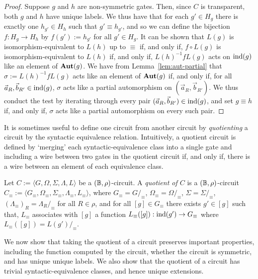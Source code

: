 \documentclass[../paper.tex]{subfiles}
\begin{document}
\begin{proof}
  Suppose $g$ and $h$ are non-symmetric gates. Then, since $C$ is transparent,
  both $g$ and $h$ have unique labels. We thus have that for each $g' \in H_g$
  there is exactly one $h_{g'} \in H_h$ such that $g' \equiv h_{g'}$, and so we
  can define the bijection $f : H_g \rightarrow H_h$ by $f(g') := h_{g'}$ for
  all $g' \in H_g$. It can be shown that $L(g)$ is isomorphism-equivalent to
  $L(h)$ up to $\equiv$ if, and only if, $f \circ L(g)$ is
  isomorphism-equivalent to $L(h)$ if, and only if, $L(h)^{-1} f L(g)$ acts on
  $\text{\upshape ind} (g)$ like an element of $\text{\textbf{Aut}}(g)$. We have from
  Lemma~\ref{lem:aut-partial} that $\sigma := L(h)^{-1} f L(g)$ acts like an
  element of $\text{\textbf{Aut}}(g)$ if, and only if, for all $\vec{a}_R, \vec{b}_{R'} \in
  \text{\upshape ind}(g)$, $\sigma$ acts like a partial automorphism on $(\vec{a}_R,
  \vec{b}_{R'})$. We thus conduct the test by iterating through every pair
  $(\vec{a}_R, \vec{b}_{R'}) \in \text{\upshape ind}(g)$, and set $g \equiv h$ if, and only if,
  $\sigma$ acts like a partial automorphism on every such pair.
\end{proof}

It is sometimes useful to define one circuit from another circuit by
\emph{quotienting} a circuit by the syntactic equivalence relation. Intuitively,
a quotient circuit is defined by `merging' each syntactic-equivalence class into
a single gate and including a wire between two gates in the quotient circuit if,
and only if, there is a wire between an element of each equivalence class.

\begin{definition}
  Let $C := \langle G, \Omega, \Sigma, \Lambda, L \rangle$ be a $(\mathbb{B},
  \rho)$-circuit. A \emph{quotient of $C$} is a $(\mathbb{B}, \rho)$-circuit $C_\equiv
  := \langle G_\equiv , \Omega_\equiv, \Sigma_\equiv , \Lambda_\equiv, L_\equiv
  \rangle$, where $G_\equiv = G /_\equiv$, $\Omega_\equiv = \Omega /_\equiv$,
  $\Sigma = \Sigma /_\equiv$, $(\Lambda_\equiv)_R = \Lambda_R /_\equiv$ for all
  $R \in \rho$, and for all $[g] \in G_\equiv$ there exists $g' \in [g]$ such
  that, $L_\equiv$ associates with $[g]$ a function $L_\equiv([g]) : \text{\upshape ind}(g')
  \rightarrow G_\equiv$ where $L_\equiv([g]) = L(g')/_\equiv$.
\end{definition}

We now show that taking the quotient of a circuit preserves important
properties, including the function computed by the circuit, whether the circuit
is symmetric, and has unique unique labels. We also show that the quotient of a
circuit has trivial syntactic-equivalence classes, and hence unique extensions.
\end{document}
